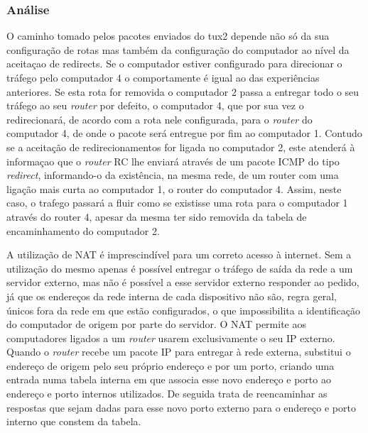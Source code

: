 \documentclass{article}
\begin{document}
\subsubsection{Análise}
O caminho tomado pelos pacotes enviados do tux2 depende não só da sua configuração de rotas mas também da configuração do computador ao nível da aceitaçao de redirects. Se o computador estiver configurado para direcionar o tráfego pelo computador 4 o comportamente é igual ao das experiências anteriores. Se esta rota for removida o computador 2 passa a entregar todo o seu tráfego ao seu \textit{router} por defeito, o computador 4, que por sua vez o redirecionará, de acordo com a rota nele configurada, para o \textit{router} do computador 4, de onde o pacote será entregue por fim ao computador 1. Contudo se a aceitação de redirecionamentos for ligada no computador 2, este atenderá à informaçao que o \textit{router} RC lhe enviará através de um pacote ICMP do tipo \textit{redirect}, informando-o da existência, na mesma rede, de um router com uma ligação mais curta ao computador 1, o router do computador 4. Assim, neste caso, o trafego passará a fluir como se existisse uma rota para o computador 1 através do router 4, apesar da mesma ter sido removida da tabela de encaminhamento do computador 2.

A utilização de NAT é imprescindível para um correto acesso à internet. Sem a utilização do mesmo apenas é possível entregar o tráfego de saída da rede a um servidor externo, mas não é possível a esse servidor externo responder ao pedido, já que os endereços da rede interna de cada dispositivo não são, regra geral, únicos fora da rede em que estão configurados, o que impossibilita a identificação do computador de origem por parte do servidor. O NAT permite aos computadores ligados a um \textit{router} usarem exclusivamente o seu IP externo. Quando o \textit{router} recebe um pacote IP para entregar à rede externa, substitui o endereço de origem pelo seu próprio endereço e por um porto, criando uma entrada numa tabela interna em que associa esse novo endereço e porto ao endereço e porto internos utilizados. De seguida trata de reencaminhar as respostas que sejam dadas para esse novo porto externo para o endereço e porto interno que constem da tabela.  
\end{document}
